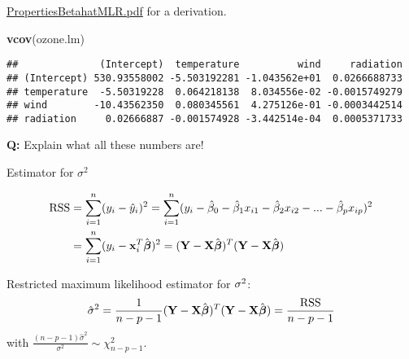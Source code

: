 \documentclass[ignorenonframetext,]{beamer}
\newenvironment{Shaded}{\begin{snugshade}}{\end{snugshade}}
\newcommand{\KeywordTok}[1]{\textcolor[rgb]{0.13,0.29,0.53}{\textbf{#1}}}
\newcommand{\NormalTok}[1]{#1}
\begin{document}
\begin{frame}[fragile]
\begin{block}{\href{https://www.math.ntnu.no/emner/TMA4268/2018v/notes/PropertiesBetahatMLR.pdf}{PropertiesBetahatMLR.pdf}
for a derivation.}
\begin{Shaded}
\begin{Highlighting}[]
\KeywordTok{vcov}\NormalTok{(ozone.lm)}
\end{Highlighting}
\end{Shaded}

\begin{verbatim}
##              (Intercept)  temperature          wind     radiation
## (Intercept) 530.93558002 -5.503192281 -1.043562e+01  0.0266688733
## temperature  -5.50319228  0.064218138  8.034556e-02 -0.0015749279
## wind        -10.43562350  0.080345561  4.275126e-01 -0.0003442514
## radiation     0.02666887 -0.001574928 -3.442514e-04  0.0005371733
\end{verbatim}

\normalsize

\textbf{Q:} Explain what all these numbers are!

\end{block}

\end{frame}

\begin{frame}

\begin{block}{Estimator for \(\sigma^2\)}

\[\begin{aligned} \text{RSS} &=\sum_{i=1}^n (y_i - \hat y_i)^2 = \sum_{i=1}^n (y_i - \hat \beta_0 - \hat \beta_1 x_{i1} - \hat \beta_2 x_{i2} -...-\hat \beta_p x_{ip} )^2 \\
&= \sum_{i=1}^n (y_i-{\bf x}_i^T \hat{\boldsymbol \beta})^2=({\bf Y}-{\bf X}\hat{\boldsymbol{\beta}})^T({\bf Y}-{\bf X}\hat{\boldsymbol{\beta}})\end{aligned}\]

Restricted maximum likelihood estimator for \({\bf \sigma}^2\):
\[ \hat{\sigma}^2=\frac{1}{n-p-1}({\bf Y}-{\bf X}\hat{\boldsymbol\beta})^T({\bf Y}-{\bf X}\hat{\boldsymbol\beta})=\frac{\text{RSS}}{n-p-1}\]
with \(\frac{(n-p-1)\hat{\sigma}^2}{\sigma^2} \sim \chi^2_{n-p-1}\).

\end{block}

\end{frame}
\end{document}

